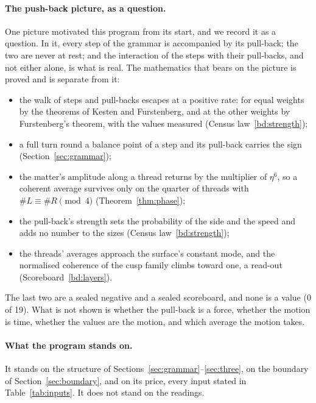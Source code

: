 \paragraph{The push-back picture, as a question.}
One picture motivated this program from its start, and we record it as a question. In it, every step of the grammar is
accompanied by its pull-back; the two are never at rest; and the interaction of the steps with their pull-backs, and not
either alone, is what is real. The mathematics that bears on the picture is proved and is separate from it:
\begin{itemize}
\item the walk of steps and pull-backs escapes at a positive rate: for equal weights by the theorems of Kesten and
  Furstenberg, and at the other weights by Furstenberg's theorem, with the values measured (Census law~\ref{bd:strength});
\item a full turn round a balance point of a step and its pull-back carries the sign (Section~\ref{sec:grammar});
\item the matter's amplitude along a thread returns by the multiplier of $\eta^6$, so a coherent average survives only on the
  quarter of threads with $\#L\equiv\#R \pmod 4$ (Theorem~\ref{thm:phase});
\item the pull-back's strength sets the probability of the side and the speed and adds no number to the sizes (Census law~\ref{bd:strength});
\item the threads' averages approach the surface's constant mode, and the normalised coherence of the cusp family climbs
  toward one, a read-out (Scoreboard~\ref{bd:layers}).
\end{itemize}
The last two are a sealed negative and a sealed scoreboard, and none is a value (0 of 19). What is not shown is whether the
pull-back is a force, whether the motion is time, whether the values are the motion, and which average the motion takes.


\paragraph{What the program stands on.}
It stands on the structure of Sections~\ref{sec:grammar}--\ref{sec:three}, on the boundary of Section~\ref{sec:boundary},
and on its price, every input stated in Table~\ref{tab:inputs}. It does not stand on the readings.
